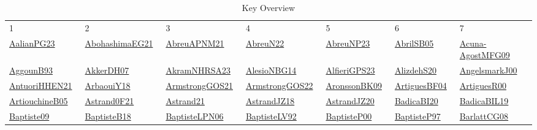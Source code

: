 {\scriptsize
\begin{longtable}{*{7}{l}}
\rowcolor{white}\caption{Key Overview}\\ \toprule
\rowcolor{white}1 & 2 & 3 & 4 & 5 & 6 & 7\\ \midrule
\endhead
\bottomrule
\endfoot
\href{works/AalianPG23.pdf}{AalianPG23}~\cite{AalianPG23} & \href{works/AbohashimaEG21.pdf}{AbohashimaEG21}~\cite{AbohashimaEG21} & \href{works/AbreuAPNM21.pdf}{AbreuAPNM21}~\cite{AbreuAPNM21} & \href{works/AbreuN22.pdf}{AbreuN22}~\cite{AbreuN22} & \href{works/AbreuNP23.pdf}{AbreuNP23}~\cite{AbreuNP23} & \href{works/AbrilSB05.pdf}{AbrilSB05}~\cite{AbrilSB05} & \href{works/Acuna-AgostMFG09.pdf}{Acuna-AgostMFG09}~\cite{Acuna-AgostMFG09}\\ 
\href{works/AggounB93.pdf}{AggounB93}~\cite{AggounB93} & \href{works/AkkerDH07.pdf}{AkkerDH07}~\cite{AkkerDH07} & \href{works/AkramNHRSA23.pdf}{AkramNHRSA23}~\cite{AkramNHRSA23} & \href{works/AlesioNBG14.pdf}{AlesioNBG14}~\cite{AlesioNBG14} & \href{works/AlfieriGPS23.pdf}{AlfieriGPS23}~\cite{AlfieriGPS23} & \href{}{AlizdehS20}~\cite{AlizdehS20} & \href{works/AngelsmarkJ00.pdf}{AngelsmarkJ00}~\cite{AngelsmarkJ00}\\ 
\href{works/AntuoriHHEN21.pdf}{AntuoriHHEN21}~\cite{AntuoriHHEN21} & \href{works/ArbaouiY18.pdf}{ArbaouiY18}~\cite{ArbaouiY18} & \href{works/ArmstrongGOS21.pdf}{ArmstrongGOS21}~\cite{ArmstrongGOS21} & \href{works/ArmstrongGOS22.pdf}{ArmstrongGOS22}~\cite{ArmstrongGOS22} & \href{works/AronssonBK09.pdf}{AronssonBK09}~\cite{AronssonBK09} & \href{works/ArtiguesBF04.pdf}{ArtiguesBF04}~\cite{ArtiguesBF04} & \href{works/ArtiguesR00.pdf}{ArtiguesR00}~\cite{ArtiguesR00}\\ 
\href{works/ArtiouchineB05.pdf}{ArtiouchineB05}~\cite{ArtiouchineB05} & \href{works/Astrand0F21.pdf}{Astrand0F21}~\cite{Astrand0F21} & \href{}{Astrand21}~\cite{Astrand21} & \href{works/AstrandJZ18.pdf}{AstrandJZ18}~\cite{AstrandJZ18} & \href{works/AstrandJZ20.pdf}{AstrandJZ20}~\cite{AstrandJZ20} & \href{works/BadicaBI20.pdf}{BadicaBI20}~\cite{BadicaBI20} & \href{works/BadicaBIL19.pdf}{BadicaBIL19}~\cite{BadicaBIL19}\\ 
\href{works/Baptiste09.pdf}{Baptiste09}~\cite{Baptiste09} & \href{works/BaptisteB18.pdf}{BaptisteB18}~\cite{BaptisteB18} & \href{}{BaptisteLPN06}~\cite{BaptisteLPN06} & \href{works/BaptisteLV92.pdf}{BaptisteLV92}~\cite{BaptisteLV92} & \href{works/BaptisteP00.pdf}{BaptisteP00}~\cite{BaptisteP00} & \href{works/BaptisteP97.pdf}{BaptisteP97}~\cite{BaptisteP97} & \href{works/BarlattCG08.pdf}{BarlattCG08}~\cite{BarlattCG08}\\ 

\end{longtable}}
